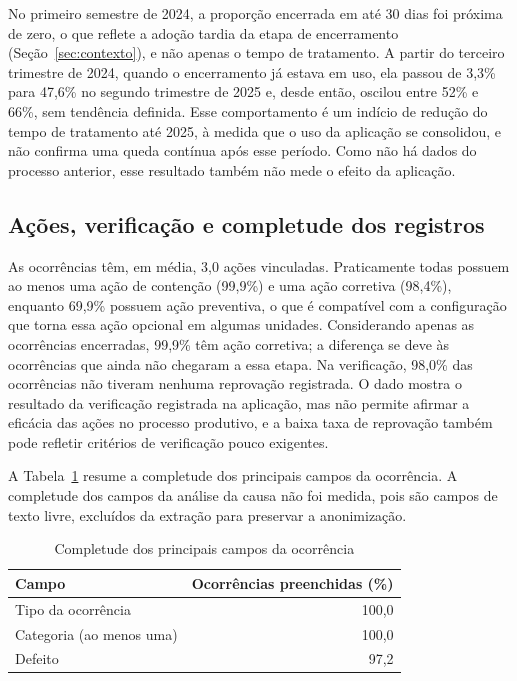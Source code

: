 No primeiro semestre de 2024, a proporção encerrada em até 30 dias foi próxima de zero, o que reflete a adoção tardia da etapa de encerramento (Seção~\ref{sec:contexto}), e não apenas o tempo de tratamento. A partir do terceiro trimestre de 2024, quando o encerramento já estava em uso, ela passou de 3,3\% para 47,6\% no segundo trimestre de 2025 e, desde então, oscilou entre 52\% e 66\%, sem tendência definida. Esse comportamento é um indício de redução do tempo de tratamento até 2025, à medida que o uso da aplicação se consolidou, e não confirma uma queda contínua após esse período. Como não há dados do processo anterior, esse resultado também não mede o efeito da aplicação.

\subsection{Ações, verificação e completude dos registros}
\label{subsec:completude}

As ocorrências têm, em média, 3,0 ações vinculadas. Praticamente todas possuem ao menos uma ação de contenção (99,9\%) e uma ação corretiva (98,4\%), enquanto 69,9\% possuem ação preventiva, o que é compatível com a configuração que torna essa ação opcional em algumas unidades. Considerando apenas as ocorrências encerradas, 99,9\% têm ação corretiva; a diferença se deve às ocorrências que ainda não chegaram a essa etapa. Na verificação, 98,0\% das ocorrências não tiveram nenhuma reprovação registrada. O dado mostra o resultado da verificação registrada na aplicação, mas não permite afirmar a eficácia das ações no processo produtivo, e a baixa taxa de reprovação também pode refletir critérios de verificação pouco exigentes.

A Tabela~\ref{tab:completude} resume a completude dos principais campos da ocorrência. A completude dos campos da análise da causa não foi medida, pois são campos de texto livre, excluídos da extração para preservar a anonimização.

\begin{table}[htb]
    \centering
    \caption{Completude dos principais campos da ocorrência}
    \label{tab:completude}
    \footnotesize
    \begin{tabular}{lr}
        \hline
        \textbf{Campo} & \textbf{Ocorrências preenchidas (\%)} \\
        \hline
        Tipo da ocorrência & 100,0 \\
        Categoria (ao menos uma) & 100,0 \\
        Defeito & 97,2 \\
        \hline
    \end{tabular}
\end{table}

